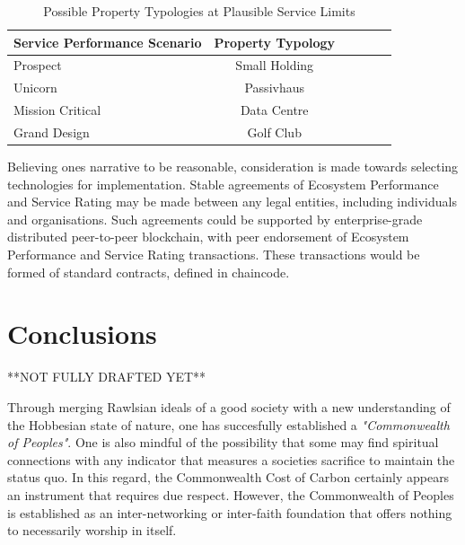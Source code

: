 \documentclass[11pt, oneside]{article}   	%
\begin{document}
\begin{table}[H]
\caption{Possible Property Typologies at Plausible Service Limits}
\begin{center}
\begin{tabular}{| l | c | c | c | c | c |}
\hline
Service Performance Scenario&Property Typology\\
\hline
Prospect&Small Holding\\
Unicorn&Passivhaus\\
Mission Critical&Data Centre\\
Grand Design&Golf Club\\
\hline
\end{tabular}
\end{center}
\label{Service limits table}
\end{table}

Believing ones narrative to be reasonable, consideration is made towards selecting technologies for implementation.
Stable agreements of Ecosystem Performance and Service Rating may be made between any legal entities, including individuals and organisations.
Such agreements could be supported by enterprise-grade distributed peer-to-peer blockchain, with peer endorsement of Ecosystem Performance and Service Rating transactions.
These transactions would be formed of standard contracts, defined in chaincode.\\

\section{Conclusions}

**NOT FULLY DRAFTED YET**

Through merging Rawlsian ideals of a good society with a new understanding of the Hobbesian state of nature, one has succesfully established a \emph{"Commonwealth of Peoples"}.
One is also mindful of the possibility that some may find spiritual connections with any indicator that measures a societies sacrifice to maintain the status quo.
In this regard, the Commonwealth Cost of Carbon certainly appears an instrument that requires due respect.
However, the Commonwealth of Peoples is established as an inter-networking or inter-faith foundation that offers nothing to necessarily worship in itself.\\
\end{document}

